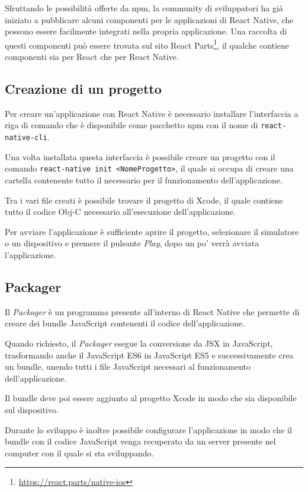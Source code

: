 Sfruttando le possibilità offerte da npm, la community di sviluppatori ha già iniziato a pubblicare alcuni componenti per le applicazioni di React Native, che possono essere facilmente integrati nella propria applicazione.
Una raccolta di questi componenti può essere trovata sul sito React Parts\footnote{\url{https://react.parts/native-ios}}, il qualche contiene componenti sia per React che per React Native.

\subsection{Creazione di un progetto}

Per creare un'applicazione con React Native è necessario installare l'interfaccia a riga di comando che è disponibile come pacchetto npm con il nome di \texttt{react-native-cli}.

Una volta installata questa interfaccia è possibile creare un progetto con il comando \texttt{react-native init <NomeProgetto>}, il quale si occupa di creare una cartella contenente tutto il necessario per il funzionamento dell'applicazione.

Tra i vari file creati è possibile trovare il progetto di Xcode, il quale contiene tutto il codice Obj-C necessario all'esecuzione dell'applicazione.

Per avviare l'applicazione è sufficiente aprire il progetto, selezionare il simulatore o un dispositivo e premere il pulsante \textit{Play}, dopo un po' verrà avviata l'applicazione.

\subsection{Packager}\label{sec:packager}

Il \textit{Packager} è un programma presente all'interno di React Native che permette di creare dei bundle JavaScript contenenti il codice dell'applicazione.

Quando richiesto, il \textit{Packager} esegue la conversione da JSX in JavaScript, trasformando anche il JavaScript ES6 in JavaScript ES5 e successivamente crea un bundle, unendo tutti i file JavaScript necessari al funzionamento dell'applicazione.

Il bundle deve poi essere aggiunto al progetto Xcode in modo che sia disponibile sul dispositivo.

Durante lo sviluppo è inoltre possibile configurare l'applicazione in modo che il bundle con il codice JavaScript venga recuperato da un server presente nel computer con il quale si sta sviluppando.

